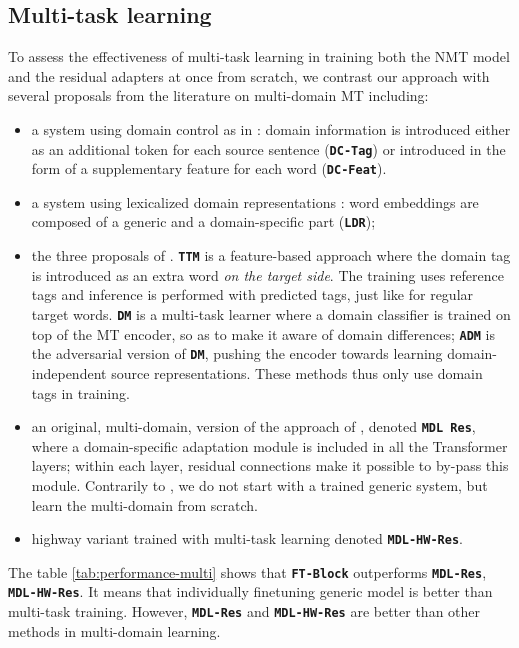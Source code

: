 \documentclass[11pt,a4paper]{article}
\newcommand{\fyDone}[1]{\done[FY]\Todo[FY:]{\textcolor{orange}{#1}}}
\newcommand{\system}[1]{\texttt{\textbf{#1}}}
\begin{document}
\subsection{Multi-task learning}
To assess the effectiveness of multi-task learning in training both the NMT model and the residual adapters at once from scratch, we contrast our approach with several proposals from the literature on multi-domain MT including:

\begin{itemize}
\item a system using domain control as in \cite{Kobus17domaincontrol}: domain information is introduced either as an additional token for each source sentence (\system{DC-Tag}) or introduced in the form of a supplementary feature for each word (\system{DC-Feat}).
\item a system using lexicalized domain representations \cite{Pham19generic}: word embeddings are composed of a generic and a domain-specific part (\system{LDR});
\item the three proposals of . \system{TTM} is a feature-based approach where the domain tag is introduced as an extra word \textsl{on the target side}. The training uses reference tags and inference is performed with predicted tags, just like for regular target words. \system{DM} is a multi-task learner where a domain classifier is trained on top of the MT encoder, so as to make it aware of domain differences; \system{ADM} is the adversarial version of \system{DM}, pushing the encoder towards learning domain-independent source representations. These methods thus only use domain tags in training.
\item an original, multi-domain, version of the approach of , denoted \system{MDL Res}, where a domain-specific adaptation module is included in all the Transformer layers; within each layer, residual connections make it possible to by-pass this module. Contrarily to \cite{Bapna19simple}, we do not start with a trained generic system, but learn the multi-domain from scratch.\fyDone{Check this.}
\item highway variant trained with multi-task learning denoted \system{MDL-HW-Res}.
\end{itemize}

The table \ref{tab:performance-multi} shows that \system{FT-Block} outperforms \system{MDL-Res}, \system{MDL-HW-Res}. It means that individually finetuning generic model is better than multi-task training. However, \system{MDL-Res} and \system{MDL-HW-Res} are better than other methods in multi-domain learning. 
\end{document}
